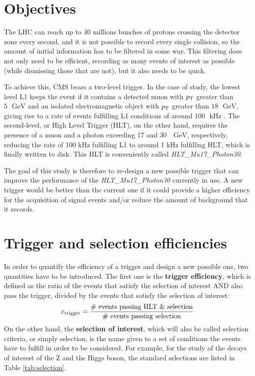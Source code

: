 \documentclass[11pt, a4paper]{article}
\newcommand{\GeV}{\textrm{ }\mathrm{GeV}}
\newcommand{\pt}{p_{\rm T}}
\begin{document}
\section{Objectives}
The LHC can reach up to 40 millions bunches of protons crossing the detector zone every second, and it is not possible to record every single collision, so the amount of initial information has to be filtered in some way. This filtering does not only need to be efficient, recording as many events of interest as possible (while dismissing those that are not), but it also needs to be quick.

To achieve this, CMS bears a two-level trigger. In the case of study, the lowest level L1 keeps the event if it contains a detected muon with $\pt$ greater than $5 \GeV$ and an isolated electromagnetic object with $\pt$ greater than $18\GeV$, giving rise to a rate of events fulfilling L1 conditions of around $100\textrm{ }\mathrm{kHz}$ . The second-level, or High Level Trigger (HLT), on the other hand, requires the presence of a muon and a photon exceeding 17 and 30 $\GeV$, respectively, reducing the rate of 100 kHz fulfilling L1 to around 1 kHz fulfilling HLT, which is finally written to disk. This HLT is conveniently called {\it HLT\_Mu17\_Photon30}.

The goal of this study is therefore to re-design a new possible trigger that can improve the performance of the {\it HLT\_Mu17\_Photon30} currently in use. A new trigger would be better than the current one if it could provide a higher efficiency for the acquisition of signal events and/or reduce the amount of background that it records.

\section{Trigger and selection efficiencies}
In order to quantify the efficiency of a trigger and design a new possible one, two quantities have to be introduced. The first one is the {\bf trigger efficiency}, which is defined as the ratio of the events that satisfy the selection of interest AND also pass the trigger, divided by the events that satisfy the selection of interest:
\begin{equation}
    \varepsilon_{\rm trigger} = \frac{{\rm \#\ events\ passing\ HLT\ \& \ selection}}{{\rm \#\ events\ passing\ selection}}
    \label{eq:trigger_efficiency}
\end{equation}
On the other hand, the {\bf selection of interest}, which will also be called selection criteria, or simply selection, is the name given to a set of conditions the events have to fulfill in order to be considered. For example, for the study of the decays of interest of the Z and the Higgs boson, the standard selections are listed in Table \ref{tab:selection}.
 
\end{document}

